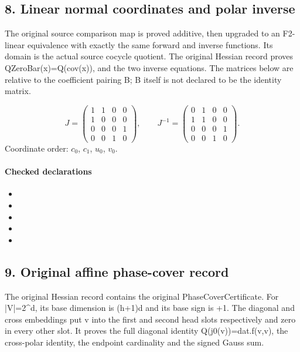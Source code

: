 \subsection*{8. Linear normal coordinates and polar inverse}
The original source comparison map is proved additive, then upgraded to an F2-linear equivalence with exactly the same forward and inverse functions. Its domain is the actual source cocycle quotient. The original Hessian record proves QZeroBar(x)=Q(cov(x)), and the two inverse equations. The matrices below are relative to the coefficient pairing B; B itself is not declared to be the identity matrix.

\[J=\begin{pmatrix}1&1&0&0\\1&0&0&0\\0&0&0&1\\0&0&1&0\end{pmatrix},\qquad J^{-1}=\begin{pmatrix}0&1&0&0\\1&1&0&0\\0&0&0&1\\0&0&1&0\end{pmatrix}.\]
Coordinate order: $c_0$, $c_1$, $u_{0}$, $v_{0}$.
\paragraph{Checked declarations}
\begin{itemize}
\item {}
\item {}
\item {}
\item {}
\item {}
\end{itemize}

\subsection*{9. Original affine phase-cover record}
The original Hessian record contains the original PhaseCoverCertificate. For |V|=2\textasciicircum{}d, its base dimension is (h+1)d and its base sign is +1. The diagonal and cross embeddings put v into the first and second head slots respectively and zero in every other slot. It proves the full diagonal identity Q(j0(v))=dat.f(v,v), the cross-polar identity, the endpoint cardinality and the signed Gauss sum.

